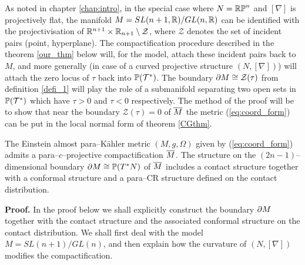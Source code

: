 As noted in chapter \ref{chap:intro}, in the special case where $N=\mathbb{RP}^n$ and $[\nabla]$ is projectively flat, the manifold $M=SL(n+1, \mathbb{R})/GL(n, \mathbb{R})$ can be identified with the projectivisation of $\mathbb{R}^{n+1}\times \mathbb{R}_{n+1}\setminus {\mathcal Z}$, where ${\mathcal Z}$ denotes the set of incident pairs (point, hyperplane). The compactification procedure described in the theorem \ref{our_thm} below will, for the model, attach these incident pairs back to $M$, and more generally (in case of a curved projective structure $(N,[\nabla])$) will attach the zero locus of $\tau$ back into $\mathbb{P}(\mathcal{T}^*)$. The boundary $\partial M \cong \mathcal{Z}(\tau)$ from definition \ref{defi_1} will play the role of a submanifold
separating two open sets in $\mathbb{P}(\mathcal{T}^*)$ which have $\tau>0$ and $\tau<0$ respectively. The method of the proof will be to show that near
the boundary ${\mathcal{Z}}(\tau)=0$ of $\overline{M}$ the metric 
(\ref{eq:coord_form}) can be put in the local normal form of theorem 
\ref{CGthm}.




\begin{theo}
\label{our_thm}
The Einstein almost para--K\"ahler metric $(M, g, \Omega)$ given by 
(\ref{eq:coord_form}) admits a para--$c$--projective compactification
$\overline{M}$. The structure on the
$(2n-1)$--dimensional boundary $\partial M\cong \mathbb{P}(T^* N)$ of $\overline{M}$ includes a contact structure together with a conformal structure 
and a para--CR structure
defined on the contact distribution.
\end{theo}
\noindent
{\bf Proof.}
In the proof below we shall explicitly construct the boundary $\partial M$ together with the contact structure and the associated conformal structure on the contact distribution. We shall
first deal with the model $M=SL(n+1)/GL(n)$, and then explain how the curvature
of $(N, [\nabla])$ modifies the compactification.

